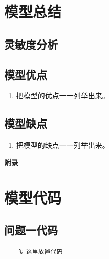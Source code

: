 \documentclass{cumcm}
\begin{document}
\section{模型总结}
\subsection{灵敏度分析}
\subsection{模型优点}
\begin{enumerate}
	\item 把模型的优点一一列举出来。
\end{enumerate}

\subsection{模型缺点}
\begin{enumerate}
	\item 把模型的缺点一一列举出来。
\end{enumerate}

\newpage


\newpage
\appendix
\textbf{附录}
\section{模型代码}
\subsection{问题一代码}
\begin{lstlisting}
	% 这里放置代码
\end{lstlisting}
\end{document}

